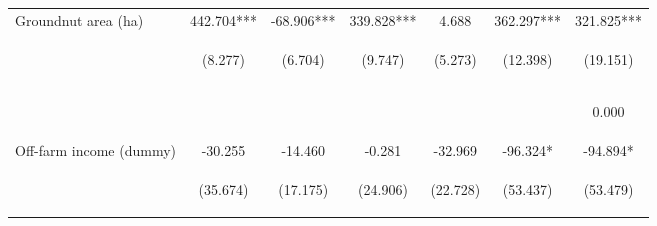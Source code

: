 \begin{center}
\begin{tabular}{lcccccc}
Groundnut area (ha) & 442.704*** & -68.906*** & 339.828*** & 4.688 & 362.297*** & 321.825*** \\
 & \begin{footnotesize}(8.277)\end{footnotesize} & \begin{footnotesize}(6.704)\end{footnotesize} & \begin{footnotesize}(9.747)\end{footnotesize} & \begin{footnotesize}(5.273)\end{footnotesize} & \begin{footnotesize}(12.398)\end{footnotesize} & \begin{footnotesize}(19.151)\end{footnotesize} \\
\vspace{4pt} & \begin{footnotesize}[0.000]\end{footnotesize} & \begin{footnotesize}[0.000]\end{footnotesize} & \begin{footnotesize}[0.000]\end{footnotesize} & \begin{footnotesize}[0.374]\end{footnotesize} & \begin{footnotesize}[0.000]\end{footnotesize} & \begin{footnotesize}0.000\end{footnotesize} \\
Off-farm income (dummy) & -30.255 & -14.460 & -0.281 & -32.969 & -96.324* & -94.894* \\
 & \begin{footnotesize}(35.674)\end{footnotesize} & \begin{footnotesize}(17.175)\end{footnotesize} & \begin{footnotesize}(24.906)\end{footnotesize} & \begin{footnotesize}(22.728)\end{footnotesize} & \begin{footnotesize}(53.437)\end{footnotesize} & \begin{footnotesize}(53.479)\end{footnotesize} \\

\end{tabular}
\end{center}
